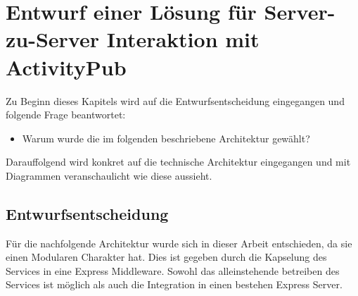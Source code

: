 
\chapter{Entwurf einer Lösung für Server-zu-Server Interaktion mit ActivityPub}
	Zu Beginn dieses Kapitels wird auf die Entwurfsentscheidung eingegangen und folgende Frage beantwortet:
	\begin{itemize}
		\item Warum wurde die im folgenden beschriebene Architektur gewählt?
	\end{itemize}
	Darauffolgend wird konkret auf die technische Architektur eingegangen und mit Diagrammen veranschaulicht wie diese aussieht.
\section{Entwurfsentscheidung}
	Für die nachfolgende Architektur wurde sich in dieser Arbeit entschieden, da sie einen Modularen Charakter hat. Dies ist gegeben durch die Kapselung des Services in eine Express Middleware. Sowohl das alleinstehende betreiben des Services ist möglich als auch die Integration in einen bestehen Express Server.
